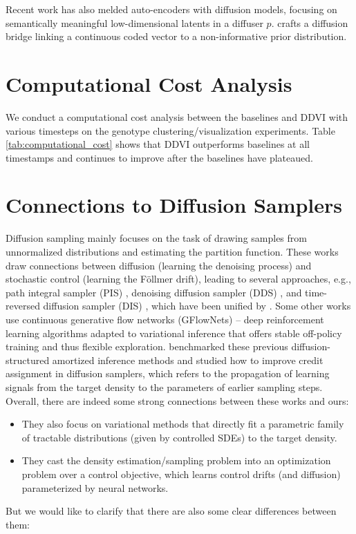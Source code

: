 \documentclass[letterpaper]{article} %
\begin{document}
Recent work \citep{preechakul2022diffusion, zhang2022unsupervised, wang2023infodiffusion} has also melded auto-encoders with diffusion models, focusing on semantically meaningful low-dimensional latents in a diffuser $p$. 
\citet{cohen2022diffusion} crafts a diffusion bridge linking a continuous coded vector to a non-informative prior distribution.


\section{Computational Cost Analysis}
\label{app:computational_cost}



We conduct a computational cost analysis between the baselines and DDVI with various timesteps on the genotype clustering/visualization experiments. Table \ref{tab:computational_cost} shows that DDVI outperforms baselines at all timestamps and continues to improve after the baselines have plateaued.

\section{Connections to Diffusion Samplers}
Diffusion sampling \cite{berner2022optimal, zhang2021path, vargas2023denoising, zhang2023diffusion, richter2023improved, sendera2024diffusion, akhound2024iterated} mainly focuses on 
the task of drawing samples from unnormalized distributions and estimating the partition function. 
These works draw connections between diffusion (learning the denoising process) and stochastic control (learning the Föllmer drift), leading to several approaches, e.g., path integral sampler (PIS) \cite{zhang2021path}, denoising diffusion sampler (DDS) \cite{vargas2023denoising}, and time-reversed diffusion sampler (DIS) \cite{berner2022optimal}, which have been unified by \citet{richter2023improved}. Some other works \cite{zhang2023diffusion, akhound2024iterated} use continuous generative flow networks (GFlowNets) – deep reinforcement learning algorithms adapted to variational inference that offers stable off-policy training and thus flexible exploration. \citet{sendera2024diffusion} benchmarked these previous diffusion-structured amortized inference methods and studied how to improve credit assignment in diffusion samplers, which refers to the propagation of learning signals from the target density to the parameters of earlier sampling steps.  Overall, there are indeed some strong connections between these works and ours:
\begin{itemize}
    \item They also focus on variational methods that directly fit a parametric family of tractable distributions (given by controlled SDEs) to the target density.
    \item They cast the density estimation/sampling problem into an optimization problem over a control objective, which learns control drifts (and diffusion) parameterized by neural networks.
\end{itemize}
But we would like to clarify that there are also some clear differences between them:
\end{document}
